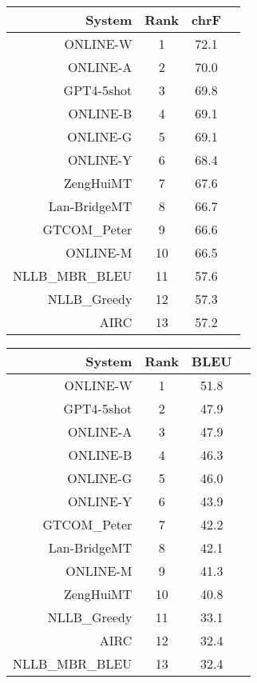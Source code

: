 \documentclass[11pt]{article}
\begin{document}
\begin{table}  
\scriptsize\begin{subtable}[t]{0.33\textwidth}
\begin{tabular}{rccc}
\toprule 
System & Rank & chrF \\ 
\midrule 
ONLINE-W & 1 & 72.1 \\ 
ONLINE-A & 2 & 70.0 \\ 
GPT4-5shot & 3 & 69.8 \\ 
ONLINE-B & 4 & 69.1 \\ 
ONLINE-G & 5 & 69.1 \\ 
ONLINE-Y & 6 & 68.4 \\ 
ZengHuiMT & 7 & 67.6 \\ 
Lan-BridgeMT & 8 & 66.7 \\ 
GTCOM\_Peter & 9 & 66.6 \\ 
ONLINE-M & 10 & 66.5 \\ 
NLLB\_MBR\_BLEU & 11 & 57.6 \\ 
NLLB\_Greedy & 12 & 57.3 \\ 
AIRC & 13 & 57.2 \\ 
\bottomrule 
\end{tabular} 
\end{subtable} 
\begin{subtable}[t]{0.33\textwidth}
\begin{tabular}{rccc}
\toprule 
System & Rank & BLEU \\ 
\midrule 
ONLINE-W & 1 & 51.8 \\ 
GPT4-5shot & 2 & 47.9 \\ 
ONLINE-A & 3 & 47.9 \\ 
ONLINE-B & 4 & 46.3 \\ 
ONLINE-G & 5 & 46.0 \\ 
ONLINE-Y & 6 & 43.9 \\ 
GTCOM\_Peter & 7 & 42.2 \\ 
Lan-BridgeMT & 8 & 42.1 \\ 
ONLINE-M & 9 & 41.3 \\ 
ZengHuiMT & 10 & 40.8 \\ 
NLLB\_Greedy & 11 & 33.1 \\ 
AIRC & 12 & 32.4 \\ 
NLLB\_MBR\_BLEU & 13 & 32.4 \\ 
\bottomrule 
\end{tabular} 
\end{subtable} 
\begin{subtable}[t]{0.33\textwidth}
\begin{tabular}{rccc}

\end{tabular}
\end{subtable}
\end{table}
\end{document}
